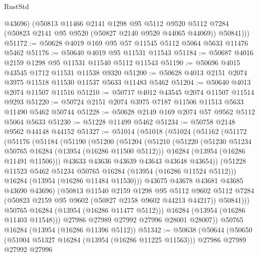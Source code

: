 \begin{lexlean}{RustStd}
\begin{coremodule}
          @43696)
        (@50813
          @11466
          @2141
          @1298
          @95
          @5112
          @9520
          @5112
          @7284
          (@50823 @2141 @95 @9520 (@50827 @2140 @9520 @44065 @44069))
          @50841)))
@51172 := @50628 @4019 @169 @95 @57 @11545 @5112 @5064 @5633 @11476 @5462
@51176 := @50640 @4019 @95 @11531 @11543
@51184 := @50687 @4016 @2159 @1298 @95 @11531 @11540 @5112 @11543
@51190 := @50696 @4015 @43545 @1712 @11531 @11538 @9320
@51200 := @50628 @4013 @2151 @2074 @3975 @11518 @11530 @11537 @5633 @11483 @5462
@51204 := @50640 @4013 @2074 @11507 @11516
@51210 := @50717 @4012 @43545 @2074 @11507 @11514 @9293
@51220 := @50724 @2151 @2074 @3975 @7187 @11506 @11513 @5633 @11490 @5462 @50744
@51228 := @50628 @2149 @169 @2074 @57 @9562 @5112 @5064 @5633
@51230 := @51228 @11499 @5462
@51234 := @50758 @2148 @9562 @44148 @44152
@51327 := @51014
    (@51018
      (@51024
        (@51162
          (@51172
            (@51176
              (@51184
                (@51190
                  (@51200
                    (@51204
                      (@51210
                        (@51220
                          (@51230 @51234 @50765 @16284 (@13954 (@16286 @11500 @5112)))
                          @16284
                          (@13954 (@16286 @11491 @11506)))
                        @43633
                        @43636
                        @43639
                        @43643
                        @43648
                        @43654))
                    (@51228 @11523 @5462 @51234 @50765 @16284 (@13954 (@16286 @11524 @5112)))
                    @16284
                    (@13954 (@16286 @11484 @11530)))
                  @43675
                  @43678
                  @43681
                  @43685
                  @43690
                  @43696)
                (@50813
                  @11540
                  @2159
                  @1298
                  @95
                  @5112
                  @9602
                  @5112
                  @7284
                  (@50823 @2159 @95 @9602 (@50827 @2158 @9602 @44213 @44217))
                  @50841)))
            @50765
            @16284
            (@13954 (@16286 @11477 @5112)))
          @16284
          (@13954 (@16286 @11403 @11548)))
        @27986
        @27989
        @27992
        @27996
        @28001
        @28007))
    @50765
    @16284
    (@13954 (@16286 @11396 @5112))
@51342 := @50638
    (@50644
      (@50650
        (@51004 @51327 @16284 (@13954 (@16286 @11225 @11563)))
        @27986
        @27989
        @27992
        @27996

\end{coremodule}
\end{lexlean}
